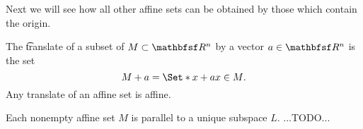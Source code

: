 Next we will see how all other affine sets can be obtained by those which contain the origin.


The \t{translate} of a subset of $M \subset \R^n$ by a vector $a \in \R^n$ is the set
$$
  M + a = \Set*{x + a}{x \in M}.
$$
Any translate of an affine set is affine.

\begin{prop}

Each nonempty affine set $M$ is parallel to a unique subspace $L$. ...TODO...

\end{prop}
\strats
